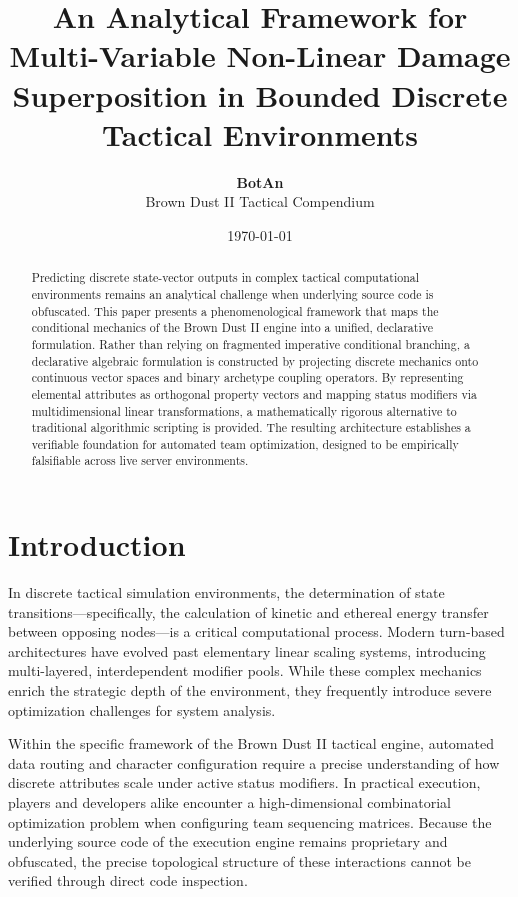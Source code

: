 \documentclass[twocolumn,10pt]{article}
\title{\textbf{An Analytical Framework for Multi-Variable Non-Linear Damage Superposition in Bounded Discrete Tactical Environments}}
\author{\textbf{BotAn} \\ \small Brown Dust II Tactical Compendium}
\date{\today}
\begin{document}
\raggedbottom

\maketitle

\begin{abstract}
Predicting discrete state-vector outputs in complex tactical computational environments remains an analytical challenge when underlying source code is obfuscated. This paper presents a phenomenological framework that maps the conditional mechanics of the Brown Dust II engine into a unified, declarative formulation. Rather than relying on fragmented imperative conditional branching, a declarative algebraic formulation is constructed by projecting discrete mechanics onto continuous vector spaces and binary archetype coupling operators. By representing elemental attributes as orthogonal property vectors and mapping status modifiers via multidimensional linear transformations, a mathematically rigorous alternative to traditional algorithmic scripting is provided. The resulting architecture establishes a verifiable foundation for automated team optimization, designed to be empirically falsifiable across live server environments.
\end{abstract}

\section{Introduction}
In discrete tactical simulation environments, the determination of state transitions—specifically, the calculation of kinetic and ethereal energy transfer between opposing nodes—is a critical computational process. Modern turn-based architectures have evolved past elementary linear scaling systems, introducing multi-layered, interdependent modifier pools. While these complex mechanics enrich the strategic depth of the environment, they frequently introduce severe optimization challenges for system analysis.

Within the specific framework of the Brown Dust II tactical engine, automated data routing and character configuration require a precise understanding of how discrete attributes scale under active status modifiers. In practical execution, players and developers alike encounter a high-dimensional combinatorial optimization problem when configuring team sequencing matrices. Because the underlying source code of the execution engine remains proprietary and obfuscated, the precise topological structure of these interactions cannot be verified through direct code inspection.
\end{document}
